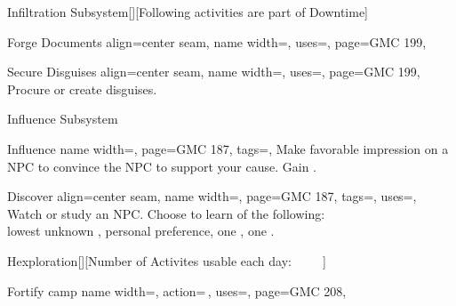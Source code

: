 \begin{PageFront}
\begin{Tables}{\frontTableHeight}
\begin{Table}{Infiltration Subsystem}[\;\dash\;][Following activities are part of Downtime]
\begin{entry}{Forge Documents}{%
                align=center seam,
                name width=\activityLength,%
                uses={\Society[tags=S]},
                page=GMC 199,
            }
            \end{entry}
            \begin{entry}{Secure Disguises}{%
                align=center seam,
                name width=\activityLength,%
                uses=,
                page=GMC 199,
            }
                Procure or create disguises. \\\phant
            \end{entry}
        \end{Table}
        \vfill
        \begin{Table}{Influence Subsystem}
            \begin{entry}{Influence}{%
                name width=\activityLength,%
                page=GMC 187,
                tags=\Concentrate\Linguistic,
            }
                Make favorable impression on a NPC to convince the NPC to support your cause.
                \hfill Gain  .
            \end{entry}
            \begin{entry}{Discover}{%
                align=center seam,
                name width=\activityLength,%
                page=GMC 187,
                tags=\Concentrate,
                uses={\Perception[tags=S]},
            }
                Watch or study an NPC.
                Choose to learn  of the following:  \hfill{}\\
                {lowest unknown  ,
                    \quad personal preference,
                    \quad one ,
                    \quad one .}
            \end{entry}
        \end{Table}
        \vfill
        \begin{Table}{Hexploration}[][Number of Activites usable each day:
        \quad\quad {}\,\Feet {}%
        \quad\quad {}\,\Feet {}%
        \quad\quad {}\,\Feet {}%
        \quad\quad {}\,\Feet {}%
        \quad\quad {}\,\Feet {}]
            \begin{entry}{Fortify camp}{%
                name width=\activityLength,%
                action=\,,
                uses=\Crafting,
                page=GMC 208,
            }

\end{entry}
\end{Table}
\end{Tables}
\end{PageFront}
